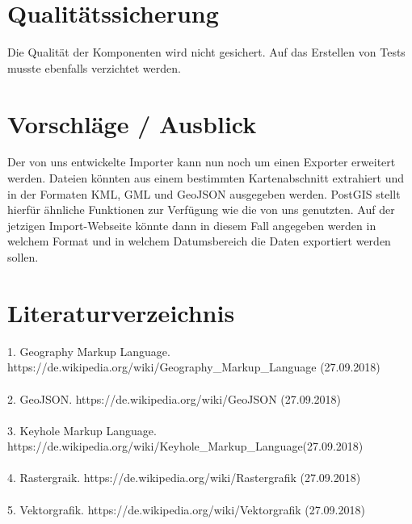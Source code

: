 \documentclass[]{article}
\begin{document}
\section{Qualitätssicherung}
Die Qualität der Komponenten wird nicht gesichert. Auf das Erstellen von Tests musste ebenfalls verzichtet werden.


\section{Vorschläge / Ausblick}
Der von uns entwickelte Importer kann nun noch um einen Exporter erweitert werden. Dateien könnten aus einem bestimmten Kartenabschnitt extrahiert und in der Formaten KML, GML und GeoJSON ausgegeben werden. PostGIS stellt hierfür ähnliche Funktionen zur Verfügung wie die von uns genutzten. Auf der jetzigen Import-Webseite könnte dann in diesem Fall angegeben werden in welchem Format und in welchem Datumsbereich die Daten exportiert werden sollen.

\newpage
\section{Literaturverzeichnis}

1. Geography Markup Language. https://de.wikipedia.org/wiki/Geography\_Markup\_Language (27.09.2018)\\
\\

2. GeoJSON. https://de.wikipedia.org/wiki/GeoJSON (27.09.2018)\\
\\

3. Keyhole Markup Language. https://de.wikipedia.org/wiki/Keyhole\_Markup\_Language(27.09.2018)\\
\\

4. Rastergraik. https://de.wikipedia.org/wiki/Rastergrafik (27.09.2018)\\
\\

5. Vektorgrafik. https://de.wikipedia.org/wiki/Vektorgrafik (27.09.2018)
\end{document}
